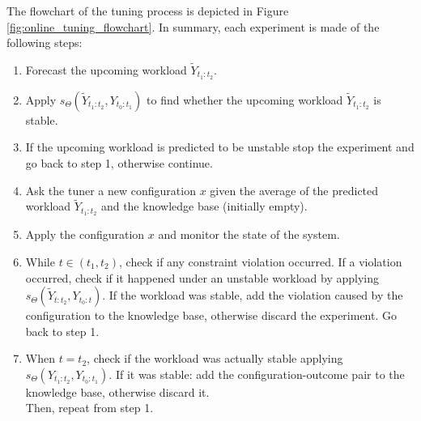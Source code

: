 \documentclass[a4paper, 12pt]{article} %
\begin{document}
	 The flowchart of the tuning process is depicted in Figure \ref{fig:online_tuning_flowchart}. In summary, each experiment is made of the following steps: 
	\begin{enumerate}
		\item Forecast the upcoming workload $\tilde{Y}_{t_1:t_2}$.
		\item Apply $s_\Theta(\tilde{Y}_{t_1:t_2}, Y_{t_0:t_1})$ to find whether the upcoming workload $\tilde{Y}_{t_1:t_2}$ is stable.
		\item If the upcoming workload is predicted to be unstable stop the experiment and go back to step 1, otherwise continue.
		\item Ask the tuner a new configuration $x$ given the average of the predicted workload $\tilde{Y}_{t_1:t_2}$ and the knowledge base (initially empty).
		\item Apply the configuration $x$ and monitor the state of the system.
		\item While $t \in (t_1, t_2)$, check if any constraint violation occurred. If a violation occurred, check if it happened under an unstable workload by applying $s_\Theta(\tilde{Y}_{t:t_2}, Y_{t_0:t})$. If the workload was stable, add the violation caused by the configuration to the knowledge base, otherwise discard the experiment. Go back to step 1.
		\item When $t=t_2$, check if the workload was actually stable applying\\ $s_\Theta(Y_{t_1:t_2}, Y_{t_0:t_1})$.  If it was stable: add the configuration-outcome pair to the knowledge base, otherwise discard it.\\
				  Then, repeat from step 1.
	\end{enumerate}
\end{document}
